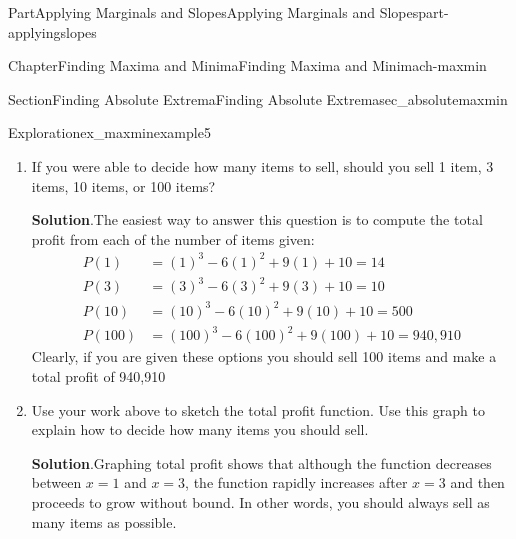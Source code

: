 \documentclass[oneside,10pt,]{tufte-book}
\newcommand{\blocktitlefont}{\relax}
\numberwithin{equation}{chapter}
\newcommand{\amp}{&}
\begin{document}
\begin{partptx}{Part}{Applying Marginals and Slopes}{}{Applying Marginals and Slopes}{}{}{part-applyingslopes}
\begin{chapterptx}{Chapter}{Finding Maxima and Minima}{}{Finding Maxima and Minima}{}{}{ch-maxmin}
\begin{sectionptx}{Section}{Finding Absolute Extrema}{}{Finding Absolute Extrema}{}{}{sec_absolutemaxmin}
\begin{exploration}{Exploration}{}{ex_maxminexample5}
\begin{enumerate}[font=\bfseries,label=(\alph*),ref=\alph*]
\begin{image}{0.25}{0.5}{0.25}{}
{\begin{tikzpicture}
\end{tikzpicture}
}%
\end{image}%
%
\par
According to this analysis, a local maximum of profit occurs at \(x=1\), and a local minimum occurs at \(x=3\).%
\item{}If you were able to decide how many items to sell, should you sell 1 item, 3 items, 10 items, or 100 items?%
\par\smallskip%
\noindent\textbf{\blocktitlefont Solution}.\hypertarget{ex_maxminexample5-3-2}{}\quad{}The easiest way to answer this question is to compute the total profit from each of the number of items given:%
\begin{align*}
P(1) \amp = (1)^3 - 6(1)^2 + 9(1) + 10 = 14\\
P(3) \amp = (3)^3 - 6(3)^2 + 9(3) + 10 = 10\\
P(10) \amp = (10)^3 - 6(10)^2 + 9(10) + 10 = 500\\
P(100) \amp = (100)^3 - 6(100)^2 + 9(100) + 10 = 940,910
\end{align*}
Clearly, if you are given these options you should sell 100 items and make a total profit of \textdollar{}940,910%
\item{}Use your work above to sketch the total profit function.  Use this graph to explain how to decide how many items you should sell.%
\par\smallskip%
\noindent\textbf{\blocktitlefont Solution}.\hypertarget{ex_maxminexample5-4-2}{}\quad{}Graphing total profit shows that although the function decreases between \(x=1\) and \(x=3\), the function rapidly increases after \(x=3\) and then proceeds to grow without bound. In other words, you should always sell as many items as possible.%
\par
\begin{image}{0.25}{0.5}{0.25}{}%
\end{image}
\end{enumerate}
\end{exploration}
\end{sectionptx}
\end{chapterptx}
\end{partptx}
\end{document}
